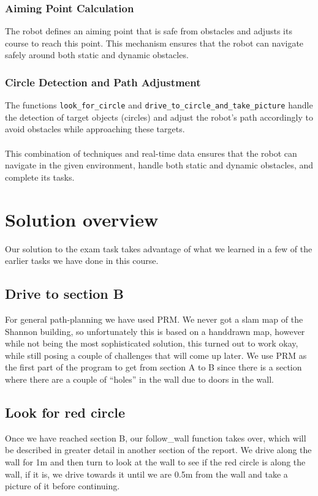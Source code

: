 \documentclass{article}
\begin{document}
	\subsubsection{Aiming Point Calculation}
	The robot defines an aiming point that is safe from obstacles and adjusts its course to reach this point. This mechanism ensures that the robot can navigate safely around both static and dynamic obstacles.
	
	\subsubsection{Circle Detection and Path Adjustment}
	The functions \texttt{look\_for\_circle} and \texttt{drive\_to\_circle\_and\_take\_picture} handle the detection of target objects (circles) and adjust the robot's path accordingly to avoid obstacles while approaching these targets.
	\\\\
	This combination of techniques and real-time data ensures that the robot can navigate in the given environment, handle both static and dynamic obstacles, and complete its tasks.
	
	\section{Solution overview}
	Our solution to the exam task takes advantage of what we learned in a few of the earlier tasks we have done in this course.
	
	\subsection*{Drive to section B}
	For general path-planning we have used PRM. We never got a slam map of the Shannon building, so unfortunately this is based on a handdrawn map, however while not being the most sophisticated solution, this turned out to work okay, while still posing a couple of challenges that will come up later. We use PRM as the first part of the program to get from section A to B since there is a section where there are a couple of “holes” in the wall due to doors in the wall. 
	
	\subsection*{Look for red circle}
	Once we have reached section B, our follow\_wall function takes over, which will be described in greater detail in another section of the report. We drive along the wall for 1m and then turn to look at the wall to see if the red circle is along the wall, if it is, we drive towards it until we are 0.5m from the wall and take a picture of it before continuing.
	
\end{document}

